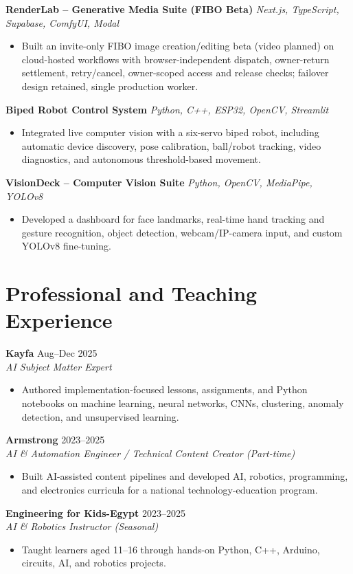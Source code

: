 \documentclass[letterpaper]{article}
\newcommand{\roleline}[3]{\textbf{#1} \hfill #2 \\\textit{#3} \\}
\newcommand{\projectheader}[2]{\textbf{#1} \hfill \textit{#2} \\}
\begin{document}
\projectheader{RenderLab -- Generative Media Suite (FIBO Beta)}{Next.js, TypeScript, Supabase, ComfyUI, Modal}
\begin{itemize}
\item Built an invite-only FIBO image creation/editing beta (video planned) on cloud-hosted workflows with browser-independent dispatch, owner-return settlement, retry/cancel, owner-scoped access and release checks; failover design retained, single production worker.
\end{itemize}

\projectheader{Biped Robot Control System}{Python, C++, ESP32, OpenCV, Streamlit}
\begin{itemize}
\item Integrated live computer vision with a six-servo biped robot, including automatic device discovery, pose calibration, ball/robot tracking, video diagnostics, and autonomous threshold-based movement.
\end{itemize}

\projectheader{VisionDeck -- Computer Vision Suite}{Python, OpenCV, MediaPipe, YOLOv8}
\begin{itemize}
\item Developed a dashboard for face landmarks, real-time hand tracking and gesture recognition, object detection, webcam/IP-camera input, and custom YOLOv8 fine-tuning.
\end{itemize}

\section*{Professional and Teaching Experience}
\roleline{Kayfa}{Aug--Dec 2025}{AI Subject Matter Expert}
\begin{itemize}
\item Authored implementation-focused lessons, assignments, and Python notebooks on machine learning, neural networks, CNNs, clustering, anomaly detection, and unsupervised learning.
\end{itemize}
\roleline{Armstrong}{2023--2025}{AI \& Automation Engineer / Technical Content Creator (Part-time)}
\begin{itemize}
\item Built AI-assisted content pipelines and developed AI, robotics, programming, and electronics curricula for a national technology-education program.
\end{itemize}
\roleline{Engineering for Kids-Egypt}{2023--2025}{AI \& Robotics Instructor (Seasonal)}
\begin{itemize}
\item Taught learners aged 11--16 through hands-on Python, C++, Arduino, circuits, AI, and robotics projects.
\end{itemize}
\end{document}
